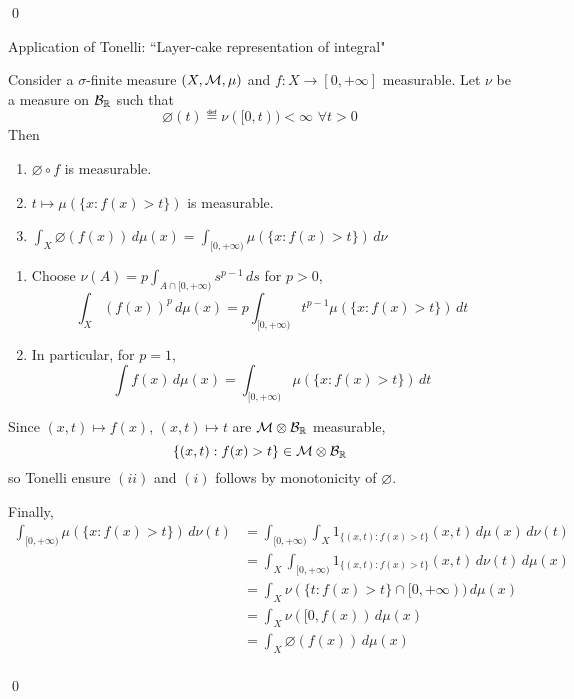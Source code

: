 \documentclass[x11names,reqno,14pt]{extarticle}
\newcommand*{\oo}{\infty}
\begin{document}
\qed

Application of Tonelli: ``Layer-cake representation of integral" 

\prop Consider a $\sigma$-finite measure $(X,\mathcal{M}, \mu)$ and $f:X\to[0,+\oo]$ measurable. Let $\nu$ be a measure on $\mathcal{B}_{\mathbb{R}}$ such that
\[
\varnothing(t)\eqdef\nu([0, t))<\oo\,\,\forall t> 0
\]
Then
\begin{enumerate}[label=(\roman*)]
\item $\varnothing\circ f$ is measurable. 
\item $t\mapsto\mu(\{x:f(x)>t\})$ is measurable. 
\item $\int_X\varnothing(f(x))\,d\mu(x) = \int_{[0, +\oo)}\mu(\{x: f(x) > t\})\,d\nu$
\end{enumerate}

\rem 
\begin{enumerate}[label=(\alph*)]
\item Choose $\nu(A) = p\int_{A\cap[0, +\oo)}s^{p - 1}\,ds$ for $p > 0$, 
\[
\int_X(f(x))^p\,d\mu(x) = p\int_{[0, +\oo)}t^{p - 1}\mu(\{x:f(x) > t\})\,dt
\]
\item In particular, for $p = 1$, 
\[
\int f(x)\,d\mu(x) = \int_{[0, +\oo)}\mu(\{x:f(x) > t\})\,dt
\]
\end{enumerate}
\proof

Since $(x, t)\mapsto f(x)$, $(x, t) \mapsto t$ are $\mathcal{M}\otimes\mathcal{B}_{\mathbb{R}}$ measurable, 
\[
\{(x, t):f(x) > t\} \in \mathcal{M}\otimes\mathcal{B}_{\mathbb{R}}
\]
so Tonelli ensure $(ii)$ and $(i)$ follows by monotonicity of $\varnothing$. 

Finally, 
\begin{align*}
\int_{[0, +\oo)}\mu(\{x:f(x) > t\})\,d\nu(t) & = \int_{[0, + \oo)}\int_X1_{\{(x, t): f(x) > t \}}(x, t)\,d\mu(x)\,d\nu(t) \\
& = \int_X\int_{[0, +\oo)}1_{\{(x, t):f(x) > t\}}(x, t)\,d\nu(t)\,d\mu(x) \\
& = \int_X\nu(\{t:f(x) > t\} \cap[0, +\oo))\,d\mu(x) \\
& = \int_X\nu([0, f(x))\,d\mu(x) \\
& = \int_X\varnothing(f(x))\,d\mu(x) \\
\end{align*}

\qed
\end{document}
